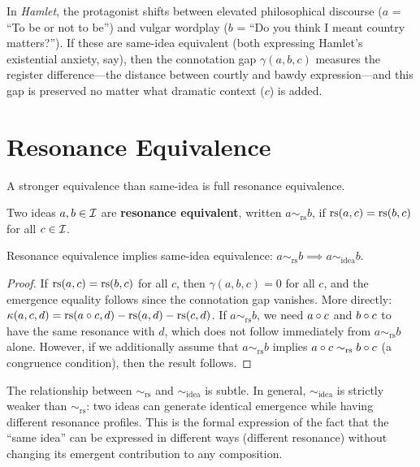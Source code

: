 \begin{example}
In \emph{Hamlet}, the protagonist shifts between elevated philosophical
discourse ($a$ = ``To be or not to be'') and vulgar wordplay ($b$ =
``Do you think I meant country matters?''). If these are same-idea
equivalent (both expressing Hamlet's existential anxiety, say), then the
connotation gap $\gamma(a, b, c)$ measures the register difference---the
distance between courtly and bawdy expression---and this gap is preserved
no matter what dramatic context ($c$) is added.
\end{example}

\section{Resonance Equivalence}

A stronger equivalence than same-idea is full resonance equivalence.

\begin{definition}
Two ideas $a, b \in \mathcal{I}$ are \textbf{resonance equivalent}, written
$a \sim_{\mathrm{rs}} b$, if $\mathrm{rs}(a, c) = \mathrm{rs}(b, c)$ for all
$c \in \mathcal{I}$.
\end{definition}

\begin{proposition}
Resonance equivalence implies same-idea equivalence:
$a \sim_{\mathrm{rs}} b \implies a \sim_{\mathrm{idea}} b$.
\end{proposition}
\begin{proof}
If $\mathrm{rs}(a,c) = \mathrm{rs}(b,c)$ for all $c$, then $\gamma(a,b,c) = 0$ for all
$c$, and the emergence equality follows since the connotation gap vanishes.
More directly: $\kappa(a,c,d) = \mathrm{rs}(a \circ c, d) - \mathrm{rs}(a,d) -
\mathrm{rs}(c,d)$. If $a \sim_{\mathrm{rs}} b$, we need $a \circ c$ and
$b \circ c$ to have the same resonance with $d$, which does not
follow immediately from $a \sim_{\mathrm{rs}} b$ alone. However, if we
additionally assume that $a \sim_{\mathrm{rs}} b$ implies $a \circ c
\sim_{\mathrm{rs}} b \circ c$ (a congruence condition), then the
result follows.
\end{proof}

\begin{remark}
The relationship between $\sim_{\mathrm{rs}}$ and $\sim_{\mathrm{idea}}$
is subtle. In general, $\sim_{\mathrm{idea}}$ is strictly weaker than
$\sim_{\mathrm{rs}}$: two ideas can generate identical emergence while
having different resonance profiles. This is the formal expression of
the fact that the ``same idea'' can be expressed in different ways
(different resonance) without changing its emergent contribution to any
composition.
\end{remark}

